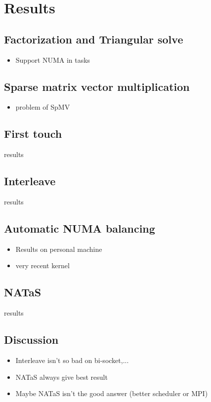 \documentclass[oneside,12t]{classes/Thesis}
\begin{document}
\section{Results}
\subsection{Factorization and Triangular solve}
  \begin{itemize}
    \item Support NUMA in tasks
  \end{itemize}
\subsection{Sparse matrix vector multiplication}
  \begin{itemize}
    \item problem of SpMV
  \end{itemize}
\subsection{First touch}
results
\subsection{Interleave}
results
\subsection{Automatic NUMA balancing}
  \begin{itemize}
    \item Results on personal machine
    \item very recent kernel
  \end{itemize}
\subsection{NATaS}
results
\subsection{Discussion}
  \begin{itemize}
    \item Interleave isn't so bad on bi-socket,...
    \item NATaS always give best result
    \item Maybe NATaS isn't the good answer (better scheduler or MPI)
  \end{itemize}
\end{document}
